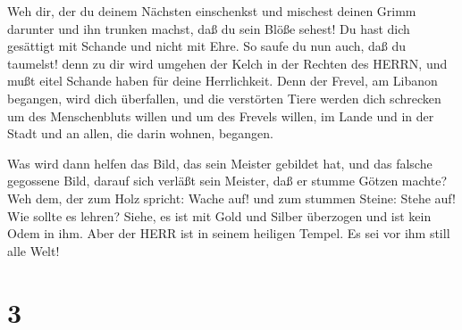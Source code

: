  Weh dir, der du deinem Nächsten einschenkst und mischest
deinen Grimm darunter und ihn trunken machst, daß du sein Blöße sehest!
 Du hast dich gesättigt mit Schande und nicht mit Ehre. So
saufe du nun auch, daß du taumelst! denn zu dir wird umgehen der Kelch
in der Rechten des HERRN, und mußt eitel Schande haben für deine
Herrlichkeit.  Denn der Frevel, am Libanon begangen, wird
dich überfallen, und die verstörten Tiere werden dich schrecken um des
Menschenbluts willen und um des Frevels willen, im Lande und in der
Stadt und an allen, die darin wohnen, begangen.

 Was wird dann helfen das Bild, das sein Meister gebildet
hat, und das falsche gegossene Bild, darauf sich verläßt sein Meister,
daß er stumme Götzen machte?  Weh dem, der zum Holz
spricht: Wache auf! und zum stummen Steine: Stehe auf! Wie sollte es
lehren? Siehe, es ist mit Gold und Silber überzogen und ist kein Odem in
ihm.  Aber der HERR ist in seinem heiligen Tempel. Es sei
vor ihm still alle Welt!

\hypertarget{section-2}{%
\section{3}\label{section-2}}

